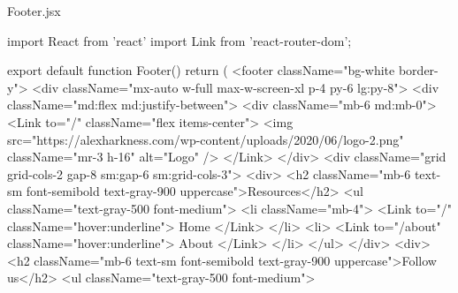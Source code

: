 Footer.jsx

                        import React from 'react'
                    import { Link } from 'react-router-dom';

                    export default function Footer() {
                        return (
                            <footer className="bg-white border-y">
                                <div className="mx-auto w-full max-w-screen-xl p-4 py-6 lg:py-8">
                                    <div className="md:flex md:justify-between">
                                        <div className="mb-6 md:mb-0">
                                            <Link to="/" className="flex items-center">
                                                <img
                                                    src="https://alexharkness.com/wp-content/uploads/2020/06/logo-2.png"
                                                    className="mr-3 h-16"
                                                    alt="Logo"
                                                />
                                            </Link>
                                        </div>
                                        <div className="grid grid-cols-2 gap-8 sm:gap-6 sm:grid-cols-3">
                                            <div>
                                                <h2 className="mb-6 text-sm font-semibold text-gray-900 uppercase">Resources</h2>
                                                <ul className="text-gray-500 font-medium">
                                                    <li className="mb-4">
                                                        <Link to="/" className="hover:underline">
                                                            Home
                                                        </Link>
                                                    </li>
                                                    <li>
                                                        <Link to="/about" className="hover:underline">
                                                            About
                                                        </Link>
                                                    </li>
                                                </ul>
                                            </div>
                                            <div>
                                                <h2 className="mb-6 text-sm font-semibold text-gray-900 uppercase">Follow us</h2>
                                                <ul className="text-gray-500 font-medium">
}
